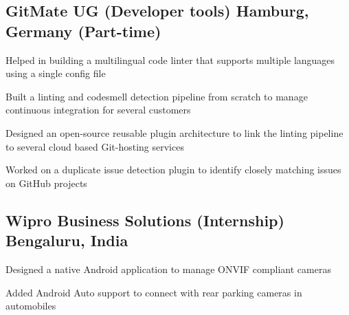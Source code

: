 \documentclass[letter,10pt]{article}
\begin{document}
\newpage


\subsection{GitMate UG (Developer tools) \hfill Hamburg, Germany (Part-time)}
\begin{zitemize}
\item Helped in building a multilingual code linter that supports multiple languages using a single config file
\item Built a linting and codesmell detection pipeline from scratch to manage continuous integration for several customers
\item Designed an open-source reusable plugin architecture to link the linting pipeline to several cloud based Git-hosting services
\item Worked on a duplicate issue detection plugin to identify closely matching issues on GitHub projects
\end{zitemize}


\subsection{Wipro Business Solutions (Internship) \hfill Bengaluru, India}
\begin{zitemize}
\item Designed a native Android application to manage ONVIF compliant cameras
\item Added Android Auto support to connect with rear parking cameras in automobiles
\end{zitemize}

\end{document}
